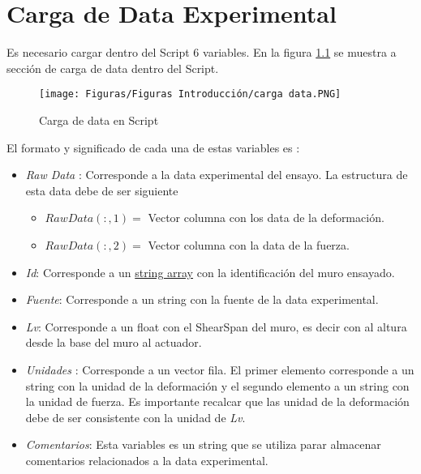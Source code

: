 \documentclass[a4paper, 11pt,article,oneside]{memoir}%
\begin{document}
\chapter{Carga de Data Experimental}\label{sec:Inputs}
Es necesario cargar dentro del Script  6 variables. En la figura \ref{fig:cargadata} se muestra a sección de carga de data dentro del Script.\par
 \begin{figure} [h!]
    \centering
    \texttt{[image: Figuras/Figuras Introducción/carga data.PNG]}
    \caption{\label{fig:cargadata} Carga de data en Script}
\end{figure}
El formato y significado de cada una de estas variables es :
\begin{itemize}
\item \textit{Raw Data} :\label{subsec:RawData}
Corresponde a la data experimental del ensayo. La estructura de esta data debe de ser  siguiente 
    \begin{itemize}
        \item $RawData(:,1) = $ Vector columna con los data de la  deformación.
        \item $RawData(:,2) = $ Vector columna con la data de la fuerza.
    \end{itemize}
\item\textit{Id}: Corresponde a un \href{https://www.mathworks.com/help/matlab/ref/string.html?searchHighlight=strings&s_tid=srchtitle_strings_1}{string array} con la identificación del muro ensayado.
\item\textit{Fuente}: 
 Corresponde a un string con la fuente de la data experimental.
\item \textit{Lv}: Corresponde a un float con el ShearSpan del muro, es decir con al altura desde la base del muro al actuador.
\item \textit{Unidades} : Corresponde a un vector fila. El primer elemento corresponde a un string con la unidad de la deformación y el segundo elemento a un string con la unidad de fuerza. Es importante recalcar que las unidad de la deformación debe de ser consistente con la unidad de \textit{Lv}.
\item{\textit{Comentarios}}: Esta variables es un string que se utiliza parar almacenar comentarios relacionados a la data experimental.
\end{itemize}
\newpage
\end{document}

